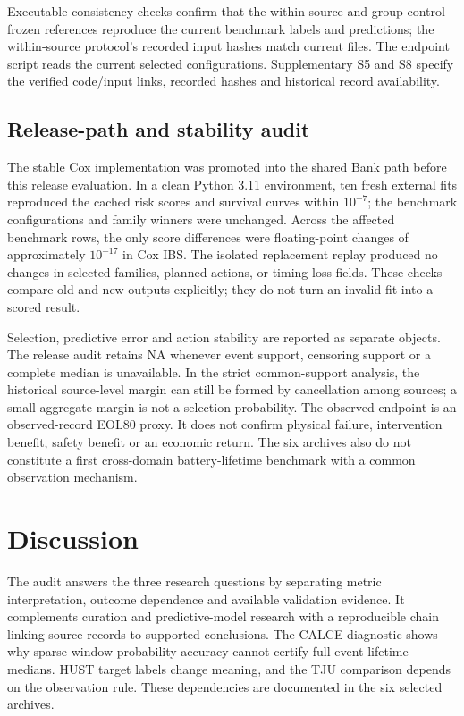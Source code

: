 \documentclass[preprint,12pt]{elsarticle}
\begin{document}
Executable consistency checks confirm that the within-source and group-control frozen references reproduce the current benchmark labels and predictions; the within-source protocol's recorded input hashes match current files. The endpoint script reads the current selected configurations. Supplementary S5 and S8 specify the verified code/input links, recorded hashes and historical record availability.

\subsection{Release-path and stability audit}
The stable Cox implementation was promoted into the shared Bank path before this release evaluation. In a clean Python 3.11 environment, ten fresh external fits reproduced the cached risk scores and survival curves within $10^{-7}$; the benchmark configurations and family winners were unchanged. Across the affected benchmark rows, the only score differences were floating-point changes of approximately $10^{-17}$ in Cox IBS. The isolated replacement replay produced no changes in selected families, planned actions, or timing-loss fields. These checks compare old and new outputs explicitly; they do not turn an invalid fit into a scored result.

Selection, predictive error and action stability are reported as separate objects. The release audit retains NA whenever event support, censoring support or a complete median is unavailable. In the strict common-support analysis, the historical source-level margin can still be formed by cancellation among sources; a small aggregate margin is not a selection probability. The observed endpoint is an observed-record EOL80 proxy. It does not confirm physical failure, intervention benefit, safety benefit or an economic return. The six archives also do not constitute a first cross-domain battery-lifetime benchmark with a common observation mechanism.\label{sec:release_audit}

\section{Discussion}
The audit answers the three research questions by separating metric interpretation, outcome dependence and available validation evidence. It complements curation and predictive-model research with a reproducible chain linking source records to supported conclusions. The CALCE diagnostic shows why sparse-window probability accuracy cannot certify full-event lifetime medians. HUST target labels change meaning, and the TJU comparison depends on the observation rule. These dependencies are documented in the six selected archives.
\end{document}
